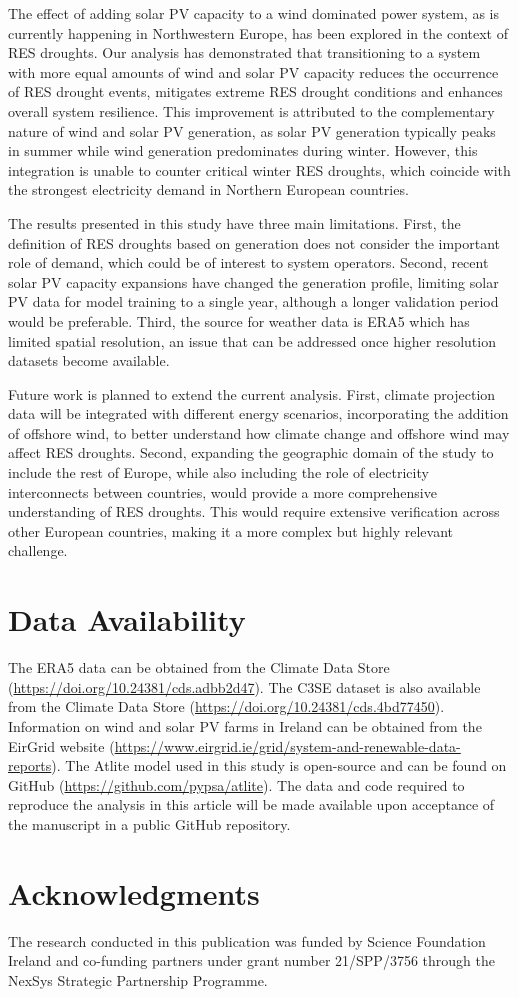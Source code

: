 \documentclass[preprint, 12pt]{elsarticle}
\begin{document}
The effect of adding solar PV capacity to a wind dominated power system, as is currently happening in Northwestern Europe, has been explored in the context of RES droughts. Our analysis has demonstrated that transitioning to a system with more equal amounts of wind and solar PV capacity reduces the occurrence of RES drought events, mitigates extreme RES drought conditions and enhances overall system resilience. This improvement is attributed to the complementary nature of wind and solar PV generation, as solar PV generation typically peaks in summer while wind generation predominates during winter. However, this integration is unable to counter critical winter RES droughts, which coincide with the strongest electricity demand in Northern European countries.

The results presented in this study have three main limitations. First, the definition of RES droughts based on generation does not consider the important role of demand, which could be of interest to system operators. Second, recent solar PV capacity expansions have changed the generation profile, limiting solar PV data for model training to a single year, although a longer validation period would be preferable. Third, the source for weather data is ERA5 which has limited spatial resolution, an issue that can be addressed once higher resolution datasets become available.

Future work is planned to extend the current analysis. First, climate projection data will be integrated with different energy scenarios, incorporating the addition of offshore wind, to better understand how climate change and offshore wind may affect RES droughts. Second, expanding the geographic domain of the study to include the rest of Europe, while also including the role of electricity interconnects between countries, would provide a more comprehensive understanding of RES droughts. This would require extensive verification across other European countries, making it a more complex but highly relevant challenge.

\section*{Data Availability}

The ERA5 data can be obtained from the Climate Data Store (\url{https://doi.org/10.24381/cds.adbb2d47}). The C3SE dataset is also available from the Climate Data Store (\url{https://doi.org/10.24381/cds.4bd77450}). Information on wind and solar PV farms in Ireland can be obtained from the EirGrid website (\url{https://www.eirgrid.ie/grid/system-and-renewable-data-reports}). The Atlite model used in this study is open-source and can be found on GitHub (\url{https://github.com/pypsa/atlite}). The data and code required to reproduce the analysis in this article will be made available upon acceptance of the manuscript in a public GitHub repository.

\section*{Acknowledgments}

The research conducted in this publication was funded by Science Foundation Ireland and co-funding partners under grant number 21/SPP/3756 through the NexSys Strategic Partnership Programme.



\end{document}
